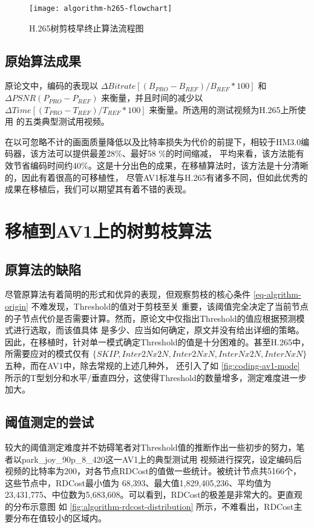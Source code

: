 \begin{figure}[H] %
  \centering
  \texttt{[image: algorithm-h265-flowchart]}
  \caption{H.265树剪枝早终止算法流程图}
  \label{fig:algorithm-h265-flowchart}
\end{figure}

\subsection{原始算法成果}

原论文中，编码的表现以 $\Delta Bitrate[ (B_{PRO} - B_{REF})/B_{REF} * 100 ]$ 和 $ \Delta PSNR(P_{PRO} - P_{REF})$ 
来衡量，并且时间的减少以 $ \Delta Time[ (T_{PRO} - T_{REF})/T_{REF} * 100 ]$ 来衡量。所选用的测试视频为H.265上所使用
的五类典型测试用视频。

在以可忽略不计的画面质量降低以及比特率损失为代价的前提下，相较于HM3.0编码器，该方法可以提供最差28\%、最好58 \%的时间缩减，
平均来看，该方法能有效节省编码时间约40\%。这是十分出色的成果，在移植算法时，该方法是十分清晰的，因此有着很高的可移植性，
尽管AV1标准与H.265有诸多不同，但如此优秀的成果在移植后，我们可以期望其有着不错的表现。

\section{移植到AV1上的树剪枝算法}

\subsection{原算法的缺陷}

尽管原算法有着简明的形式和优异的表现，但观察剪枝的核心条件 \ref{eq-algrithm-origin} 不难发现，Threshold的值对于剪枝至关
重要，该阈值完全决定了当前节点的子节点代价是否需要计算。然而，原论文中仅指出Threshold的值应根据预测模式进行选取，而该值具体
是多少、应当如何确定，原文并没有给出详细的策略。因此，在移植时，针对单一模式确定Threshold的值是十分困难的。甚至H.265中，
所需要应对的模式仅有 $\{ SKIP, Inter2Nx2N, Inter2NxN, InterNx2N, InterNxN \} $ 五种，而在AV1中，除去常规的上述几种外，
还引入了如 \ref{fig:coding-av1-mode} 所示的T型划分和水平/垂直四分，这使得Threshold的数量增多，测定难度进一步加大。

\subsection{阈值测定的尝试}

较大的阈值测定难度并不妨碍笔者对Threshold值的推断作出一些初步的努力，笔者以park\_joy\_90p\_8\_420这一AV1上的典型测试用
视频进行探究，设定编码后视频的比特率为200，对各节点RDCost的值做一些统计。被统计节点共5166个，这些节点中，RDCost最小值为
68,393、最大值1,829,405,236、平均值为23,431,775、中位数为5,683,608。可以看到，RDCost的极差是非常大的。更直观的分布示意图
如 \ref{fig:algorithm-rdcost-distribution} 所示，不难看出，RDCost主要分布在值较小的区域内。

